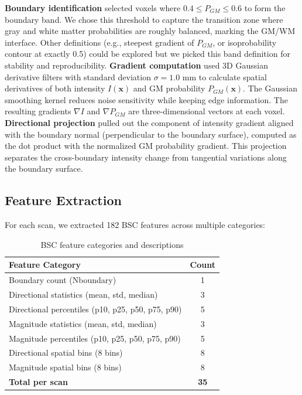 \documentclass[blue]{ludusofficial}  %
\begin{document}
\textbf{Boundary identification} selected voxels where $0.4 \leq P_{GM} \leq 0.6$ to form the boundary band. We chose this threshold to capture the transition zone where gray and white matter probabilities are roughly balanced, marking the GM/WM interface. Other definitions (e.g., steepest gradient of $P_{GM}$, or isoprobability contour at exactly 0.5) could be explored but we picked this band definition for stability and reproducibility. \textbf{Gradient computation} used 3D Gaussian derivative filters with standard deviation $\sigma = 1.0$ mm to calculate spatial derivatives of both intensity $I(\mathbf{x})$ and GM probability $P_{GM}(\mathbf{x})$. The Gaussian smoothing kernel reduces noise sensitivity while keeping edge information. The resulting gradients $\nabla I$ and $\nabla P_{GM}$ are three-dimensional vectors at each voxel. \textbf{Directional projection} pulled out the component of intensity gradient aligned with the boundary normal (perpendicular to the boundary surface), computed as the dot product with the normalized GM probability gradient. This projection separates the cross-boundary intensity change from tangential variations along the boundary surface.

\subsection{Feature Extraction}

For each scan, we extracted 182 BSC features across multiple categories:

\begin{table}[h!]
\centering
\caption{BSC feature categories and descriptions}
\label{tab:bsc-features}
\begin{tabular}{lc}
\hline
\textbf{Feature Category} & \textbf{Count} \\
\hline
Boundary count (Nboundary) & 1 \\
Directional statistics (mean, std, median) & 3 \\
Directional percentiles (p10, p25, p50, p75, p90) & 5 \\
Magnitude statistics (mean, std, median) & 3 \\
Magnitude percentiles (p10, p25, p50, p75, p90) & 5 \\
Directional spatial bins (8 bins) & 8 \\
Magnitude spatial bins (8 bins) & 8 \\
\hline
\textbf{Total per scan} & \textbf{35} \\
\hline
\end{tabular}
\end{table}
\end{document}
